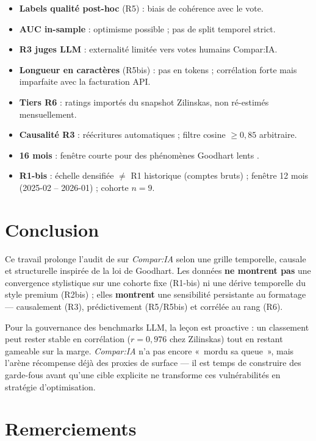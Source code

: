 \documentclass[11pt,a4paper]{article}
\begin{document}
\begin{itemize}
  \item \textbf{Labels qualité post-hoc} (R5) : biais de cohérence avec le vote.
  \item \textbf{AUC in-sample} : optimisme possible ; pas de split temporel strict.
  \item \textbf{R3 juges LLM} : externalité limitée vers votes humains Compar:IA.
  \item \textbf{Longueur en caractères} (R5bis) : pas en tokens ; corrélation forte
        mais imparfaite avec la facturation API.
  \item \textbf{Tiers R6} : ratings importés du snapshot Zilinskas, non ré-estimés
        mensuellement.
  \item \textbf{Causalité R3} : réécritures automatiques ; filtre cosine $\geq 0{,}85$
        arbitraire.
  \item \textbf{16 mois} : fenêtre courte pour des phénomènes Goodhart lents
        \citep{espeland2016engines}.
  \item \textbf{R1-bis} : échelle densifiée $\neq$ R1 historique (comptes bruts) ;
        fenêtre 12 mois (2025-02 -- 2026-01) ; cohorte $n=9$.
\end{itemize}

\section{Conclusion}
\label{sec:conclusion}

Ce travail prolonge l'audit de \citet{zilinskas2026formatting} sur \emph{Compar:IA}
selon une grille temporelle, causale et structurelle inspirée de la loi de Goodhart.
Les données \textbf{ne montrent pas} une convergence stylistique sur une cohorte
fixe (R1-bis) ni une dérive temporelle du style premium (R2bis) ; elles \textbf{montrent} une sensibilité persistante
au formatage --- causalement (R3), prédictivement (R5/R5bis) et corrélée au rang
(R6).

Pour la gouvernance des benchmarks LLM, la leçon est proactive : un classement peut
rester stable en corrélation ($r = 0{,}976$ chez Zilinskas) tout en restant
gameable sur la marge. \emph{Compar:IA} n'a pas encore «~mordu sa queue~», mais
l'arène récompense déjà des proxies de surface --- il est temps de construire des
garde-fous avant qu'une cible explicite ne transforme ces vulnérabilités en
stratégie d'optimisation.

\section*{Remerciements}
\end{document}
